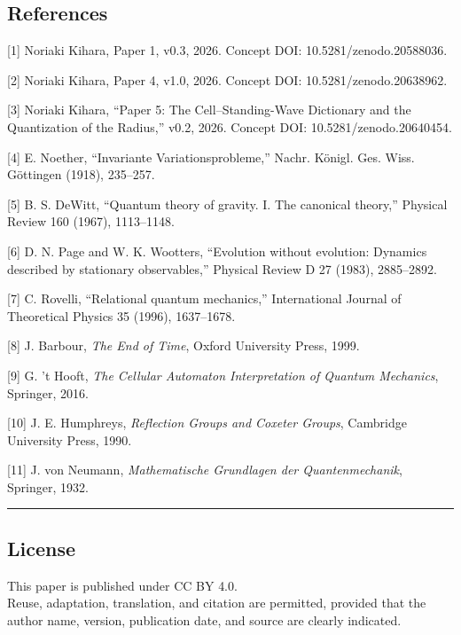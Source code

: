 \documentclass[
]{article}
\begin{document}
\subsection{References}\label{references}

{[}1{]} Noriaki Kihara, Paper 1, v0.3, 2026. Concept DOI:
10.5281/zenodo.20588036.

{[}2{]} Noriaki Kihara, Paper 4, v1.0, 2026. Concept DOI:
10.5281/zenodo.20638962.

{[}3{]} Noriaki Kihara, ``Paper 5: The Cell--Standing-Wave Dictionary
and the Quantization of the Radius,'' v0.2, 2026. Concept DOI:
10.5281/zenodo.20640454.

{[}4{]} E. Noether, ``Invariante Variationsprobleme,'' Nachr. Königl.
Ges. Wiss. Göttingen (1918), 235--257.

{[}5{]} B. S. DeWitt, ``Quantum theory of gravity. I. The canonical
theory,'' Physical Review 160 (1967), 1113--1148.

{[}6{]} D. N. Page and W. K. Wootters, ``Evolution without evolution:
Dynamics described by stationary observables,'' Physical Review D 27
(1983), 2885--2892.

{[}7{]} C. Rovelli, ``Relational quantum mechanics,'' International
Journal of Theoretical Physics 35 (1996), 1637--1678.

{[}8{]} J. Barbour, \emph{The End of Time}, Oxford University Press,
1999.

{[}9{]} G. 't Hooft, \emph{The Cellular Automaton Interpretation of
Quantum Mechanics}, Springer, 2016.

{[}10{]} J. E. Humphreys, \emph{Reflection Groups and Coxeter Groups},
Cambridge University Press, 1990.

{[}11{]} J. von Neumann, \emph{Mathematische Grundlagen der
Quantenmechanik}, Springer, 1932.

\begin{center}\rule{0.5\linewidth}{0.5pt}\end{center}

\subsection{License}\label{license}

This paper is published under CC BY 4.0.\\
Reuse, adaptation, translation, and citation are permitted, provided
that the author name, version, publication date, and source are clearly
indicated.
\end{document}
